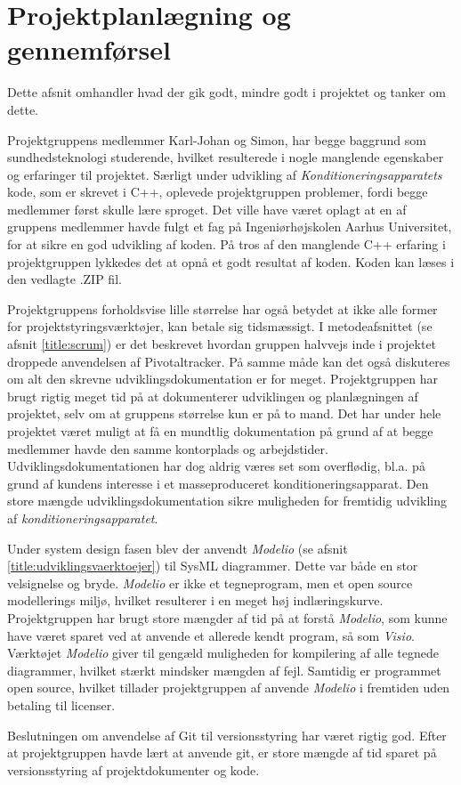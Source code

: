 \section{Projektplanlægning og gennemførsel}
Dette afsnit omhandler hvad der gik godt, mindre godt i projektet og tanker om dette.

Projektgruppens medlemmer Karl-Johan og Simon, har begge baggrund som sundhedsteknologi studerende, hvilket resulterede i nogle manglende egenskaber og erfaringer til projektet. Særligt under udvikling af \textit{Konditioneringsapparatets} kode, som er skrevet i C++, oplevede projektgruppen problemer, fordi begge medlemmer først skulle lære sproget. Det ville have været oplagt at en af gruppens medlemmer havde fulgt et fag på Ingeniørhøjskolen Aarhus Universitet, for at sikre en god udvikling af koden. På tros af den manglende C++ erfaring i projektgruppen lykkedes det at opnå et godt resultat af koden. Koden kan læses i den vedlagte .ZIP fil.

Projektgruppens forholdsvise lille størrelse har også betydet at ikke alle former for projektstyringsværktøjer, kan betale sig tidsmæssigt. I metodeafsnittet (se afsnit \ref{title:scrum}) er det beskrevet hvordan gruppen halvvejs inde i projektet droppede anvendelsen af Pivotaltracker. På samme måde kan det også diskuteres om alt den skrevne udviklingsdokumentation er for meget. Projektgruppen har brugt rigtig meget tid på at dokumenterer udviklingen og planlægningen af projektet, selv om at gruppens størrelse kun er på to mand. Det har under hele projektet været muligt at få en mundtlig dokumentation på grund af at begge medlemmer havde den samme kontorplads og arbejdstider.
Udviklingsdokumentationen har dog aldrig væres set som overflødig, bl.a. på grund af kundens interesse i et masseproduceret konditioneringsapparat. Den store mængde udviklingsdokumentation sikre muligheden for fremtidig udvikling af \textit{konditioneringsapparatet}. 

Under system design fasen blev der anvendt \textit{Modelio} (se afsnit \ref{title:udviklingsvaerktoejer}) til SysML diagrammer. Dette var både en stor velsignelse og bryde. \textit{Modelio} er ikke et tegneprogram, men et open source modellerings miljø, hvilket resulterer i en meget høj indlæringskurve. Projektgruppen har brugt store mængder af tid på at forstå \textit{Modelio}, som kunne have været sparet ved at anvende et allerede kendt program, så som \textit{Visio}. Værktøjet \textit{Modelio} giver til gengæld muligheden for kompilering af alle tegnede diagrammer, hvilket stærkt mindsker mængden af fejl. Samtidig er programmet open source, hvilket tillader projektgruppen af anvende \textit{Modelio} i fremtiden uden betaling til licenser.

Beslutningen om anvendelse af Git til versionsstyring har været rigtig god. Efter at projektgruppen havde lært at anvende git, er store mængde af tid sparet på versionsstyring af projektdokumenter og kode.

